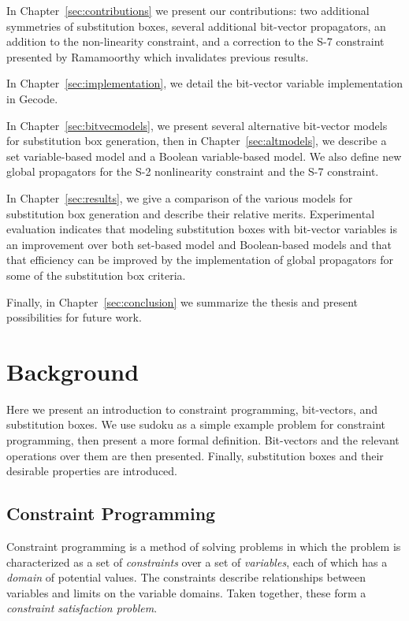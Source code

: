 \documentclass[a4paper,10pt,twoside,openright]{book}
\begin{document}
In Chapter~\ref{sec:contributions} we present our contributions: 
two additional symmetries of substitution boxes,
several additional bit-vector propagators, 
an addition to the non-linearity constraint,
and
a correction to the S-7 constraint presented by Ramamoorthy which invalidates previous results.

In Chapter~\ref{sec:implementation}, we detail the bit-vector variable implementation in Gecode. 

In Chapter~\ref{sec:bitvecmodels}, we present several alternative bit-vector models
for substitution box generation, then 
in Chapter~\ref{sec:altmodels}, we describe a set variable-based model 
and a Boolean variable-based model.
We also define new global propagators for the S-2 nonlinearity constraint
and the S-7 constraint.

In Chapter~\ref{sec:results}, we give a comparison of the various models for substitution box generation and describe their relative merits.
Experimental evaluation indicates that modeling substitution boxes with bit-vector variables is an improvement 
over both 
set-based model and 
Boolean-based models
and that 
that efficiency can be improved by 
the implementation of global propagators for some of the substitution box criteria.

Finally, in Chapter~\ref{sec:conclusion} we summarize the thesis and present
possibilities for future work.

\chapter{Background}
\label{sec:background}
Here we present an introduction to constraint programming, bit-vectors, and substitution boxes.
We use sudoku as a simple example problem for constraint programming, then present a more formal definition.
Bit-vectors and the relevant operations over them are then presented.
Finally, substitution boxes and their desirable properties are introduced.

\section{Constraint Programming}
Constraint programming is a method of solving problems in which the problem is characterized as a set of \textit{constraints} over a set of \textit{variables}, each of which has a \textit{domain} of potential values. The constraints describe relationships between variables and limits on the variable domains. Taken together, these form a \textit{constraint satisfaction problem}.
\end{document}
